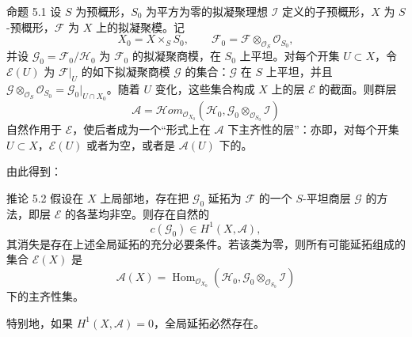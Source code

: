 \begin{statement}{命题 5.1}
设 $S$ 为预概形，$S_0$ 为平方为零的拟凝聚理想 $\mathcal I$ 定义的子预概形，$X$ 为 $S$-预概形，$\mathcal F$ 为 $X$ 上的拟凝聚模。记
\[
X_0=X\times_SS_0,\qquad
\mathcal F_0=\mathcal F\otimes_{\mathcal O_S}\mathcal O_{S_0},
\]
并设 $\mathcal G_0=\mathcal F_0/\mathcal H_0$ 为 $\mathcal F_0$ 的拟凝聚商模，在 $S_0$ 上平坦。对每个开集 $U\subset X$，令 $\mathcal E(U)$ 为 $\mathcal F|_U$ 的如下拟凝聚商模 $\mathcal G$ 的集合：$\mathcal G$ 在 $S$ 上平坦，并且 $\mathcal G\otimes_{\mathcal O_S}\mathcal O_{S_0}=\mathcal G_0|_{U\cap X_0}$。随着 $U$ 变化，这些集合构成 $X$ 上的层 $\mathcal E$ 的截面。则群层
\[
\mathcal A=\mathcal{H}om_{\mathcal O_{X_0}}
\left(\mathcal H_0,\mathcal G_0\otimes_{\mathcal O_{S_0}}\mathcal I\right)
\]
自然作用于 $\mathcal E$，使后者成为一个“形式上在 $\mathcal A$ 下主齐性的层”：亦即，对每个开集 $U\subset X$，$\mathcal E(U)$ 或者为空，或者是 $\mathcal A(U)$ 下的。
\end{statement}
由此得到：
\begin{statement}{推论 5.2}
假设在 $X$ 上局部地，存在把 $\mathcal G_0$ 延拓为 $\mathcal F$ 的一个 $S$-平坦商层 $\mathcal G$ 的方法，即层 $\mathcal E$ 的各茎均非空。则存在自然的
\[
c(\mathcal G_0)\in H^1(X,\mathcal A),
\]
其消失是存在上述全局延拓的充分必要条件。若该类为零，则所有可能延拓组成的集合 $\mathcal E(X)$ 是
\[
\mathcal A(X)=\operatorname{Hom}_{\mathcal O_{X_0}}
\left(\mathcal H_0,\mathcal G_0\otimes_{\mathcal O_{S_0}}\mathcal I\right)
\]
下的主齐性集。
\end{statement}
特别地，如果 $H^1(X,\mathcal A)=0$，全局延拓必然存在。

